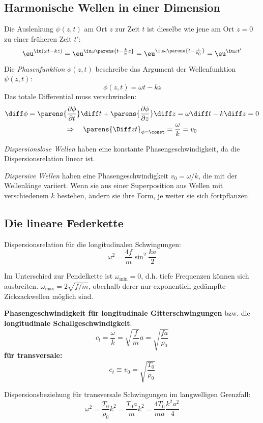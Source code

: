 	\subsection{Harmonische Wellen in einer Dimension} %
		Die Auslenkung $\psi(z,t)$ am Ort $z$ zur Zeit $t$ ist dieselbe wie jene am Ort $z=0$ zu einer früheren Zeit $t'$:
		\[
			\eu^{\iu(\omega t - k z)} = \eu^{\iu \omega\parens{t-\frac k \omega z}} = \eu^{\iu\omega\parens{t-\frac{z}{v_0}}} = \eu^{\iu\omega t'}
		\]
		
		Die \emph{Phasenfunktion} $\phi(z,t)$ beschreibe das Argument der Wellenfunktion $\psi(z,t)$:
		\[
			\phi(z,t) = \omega t - k z
		\]
		Das totale Differential muss verschwinden:
		\begin{gather*}
			\diff \phi = \parens{\frac{\partial\phi}{\partial t}} \diff t + \parens{\frac{\partial \phi}{\partial z}} \diff z = \omega \diff t - k \diff z = 0 \\
			\Rightarrow \quad \parens{\Diff z t}_{\phi = \const} = \frac \omega k = v_0
		\end{gather*}    
		
		\emph{Dispersionslose Wellen} haben eine konstante Phasengeschwindigkeit, da die Dispersionsrelation linear ist.
		
		\emph{Dispersive Wellen} haben eine Phasengeschwindigkeit $v_0 = \omega/k$, die mit der Wellenlänge variiert. Wenn sie aus einer Superposition aus Wellen mit verschiedenem $k$ bestehen, ändern sie ihre Form, je weiter sie sich fortpflanzen.
	\subsection{Die lineare Federkette} %
		Dispersionsrelation für die longitudinalen Schwingungen:
		\[
			\omega^2 = \frac{4f}{m} \sin^2 \frac{ka}{2}
		\]
		
		Im Unterschied zur Pendelkette ist $\omega_\text{min} = 0$, d.h.  tiefe Frequenzen können sich ausbreiten. $\omega_\text{max} = 2\sqrt{f/m}$, oberhalb derer nur exponentiell gedämpfte Zickzackwellen möglich sind.
		
		\textbf{Phasengeschwindigkeit für longitudinale Gitterschwingungen} bzw. die \textbf{longitudinale Schallgeschwindigkeit}:
		\[
			c_l = \frac \omega k = \sqrt{\frac f m} a = \sqrt{\frac{fa}{\rho_0}}
		\]
		\textbf{für transversale:}
		\[
			c_t \equiv v_0 = \sqrt{\frac{T_0}{\rho_0}}
		\]
		
		Dispersionsbeziehung für transversale Schwingungen im langwelligen Grenzfall:
		\[
			\omega^2 = \frac{T_0}{\rho_0} k^2 = \frac{T_0 a}{m} k^2 = \frac{4 T_0}{ma} \frac{k^2 a^2}{4}
		\]
		
